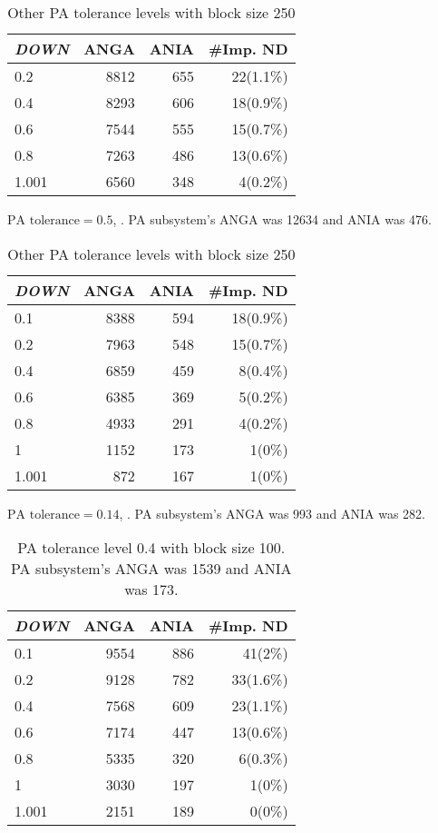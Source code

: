 \begin{table}[ht]
\centering
\begin{subtable}[h]{0.45\textwidth}
\begin{tabular}{lrrr}
\hline
\textit{DOWN} & ANGA  & ANIA & \#Imp. ND \\ \hline
0.2   & 8812 & 655 & 22(1.1\%) \\
0.4   & 8293 & 606 & 18(0.9\%) \\
0.6   & 7544 & 555 & 15(0.7\%) \\
0.8   & 7263 & 486 & 13(0.6\%) \\
1.001 & 6560 & 348 & 4(0.2\%) 

\end{tabular}
 \caption{$\text{PA tolerance} = 0.5$, . PA subsystem's ANGA was 12634 and ANIA was 476.}
 \label{tab:app-BL250-tol-0.5}
\end{subtable}
\hfill
\begin{subtable}[h]{0.45\textwidth}
\centering
\begin{tabular}{lrrr}
\hline
\textit{DOWN} & ANGA  & ANIA & \#Imp. ND  \\ \hline
0.1   & 8388 & 594 & 18(0.9\%) \\
0.2   & 7963 & 548 & 15(0.7\%) \\
0.4   & 6859 & 459 & 8(0.4\%)  \\
0.6   & 6385 & 369 & 5(0.2\%)  \\
0.8   & 4933 & 291 & 4(0.2\%)  \\
1     & 1152 & 173 & 1(0\%)    \\
1.001 & 872  & 167 & 1(0\%) 
 \end{tabular}
 \caption{$\text{PA tolerance} = 0.14$, . PA subsystem's ANGA was 993 and ANIA was 282.}
\label{tab:app-BL250-tol-0.14}
\end{subtable}

\caption{Other PA tolerance levels with block size 250}
\label{tab:app-BL250-diffANGAs}
\end{table}



\begin{table}[ht]
\centering
\begin{tabular}{lrrr}
\hline
\textit{DOWN} & ANGA  & ANIA & \#Imp. ND \\ \hline
0.1   & 9554 & 886 & 41(2\%)   \\
0.2   & 9128 & 782 & 33(1.6\%) \\
0.4   & 7568 & 609 & 23(1.1\%) \\
0.6   & 7174 & 447 & 13(0.6\%) \\
0.8   & 5335 & 320 & 6(0.3\%)  \\
1     & 3030 & 197 & 1(0\%)    \\
1.001 & 2151 & 189 & 0(0\%)  
\end{tabular}
\caption{PA tolerance level 0.4 with block size 100. PA subsystem's ANGA was 1539 and ANIA was 173.}
\label{tab:app-BL100-diffANGAs}
\end{table}

